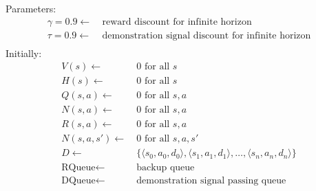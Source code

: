 \documentclass{article}
\begin{document}
\begin{comment}

Parameters:
\[\begin{split}
  \alpha = 0.1 \leftarrow\ & q(s,a)\ \text{learning rate}\\
  \gamma = 0.9 \leftarrow\ & \text{discount for infinite horizon}\\
  \tau = \alpha \leftarrow\ & \text{temperature diffusion coefficient}\\
  \delta = 0.995 \leftarrow\ & \text{temperature decay coefficient}\\
  \text{\it MaxTemp} = 50 \leftarrow\ &  \text{maximum temperature}\\
  \text{\it MinTemp} = 2 \leftarrow\ &  \text{minimum temperature}\\
  \theta \leftarrow\ & \text{lenience moderation factor}\\
\end{split}\]

\end{comment}
Parameters:
\[
\begin{split}
\gamma = 0.9 \leftarrow\ & \text{reward discount for infinite horizon }\\
\tau = 0.9 \leftarrow\ & \text{demonstration signal discount for infinite horizon}\\
\end{split}
\]
Initially:
\[\begin{split}
V(s) \leftarrow &\ 0 \text{ for all } s\\
H(s) \leftarrow &\ 0 \text{ for all } s\\
Q(s,a) \leftarrow &\ 0 \text{ for all } s,a\\
N(s,a) \leftarrow &\ 0 \text{ for all } s,a\\
R(s,a) \leftarrow &\ 0  \text{ for all } s,a\\
N(s,a,s') \leftarrow &\ 0  \text{ for all } s,a,s'\\
D \leftarrow &\ \{\langle s_0,a_0,d_0\rangle , \langle s_1,a_1,d_1\rangle , \ldots ,\langle s_n,a_n,d_n\rangle \}\\
\text{RQueue} \leftarrow &\ \text{backup queue}\\
\text{DQueue} \leftarrow &\ \text{demonstration signal passing queue}
\end{split}\]
\end{document}
